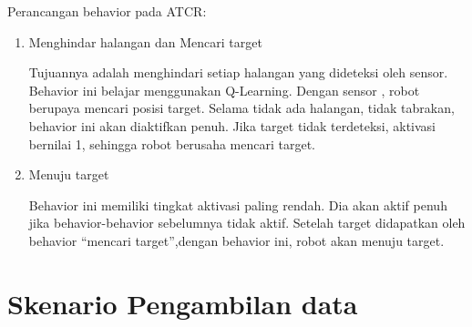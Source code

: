 





Perancangan behavior pada ATCR:

\begin{enumerate}
	\item Menghindar halangan dan Mencari target
	
 Tujuannya adalah menghindari setiap halangan yang dideteksi oleh sensor. Behavior ini belajar menggunakan Q-Learning. 
Dengan sensor , robot berupaya mencari posisi target. Selama tidak ada halangan, tidak tabrakan, behavior ini akan diaktifkan penuh. Jika target tidak terdeteksi, aktivasi bernilai 1, sehingga robot berusaha mencari target.

\item Menuju target

Behavior ini memiliki tingkat aktivasi paling rendah. Dia akan aktif penuh jika behavior-behavior sebelumnya tidak aktif. Setelah target didapatkan oleh behavior “mencari target”,dengan behavior ini, robot akan menuju target.

\end{enumerate}









\section{Skenario Pengambilan data}

